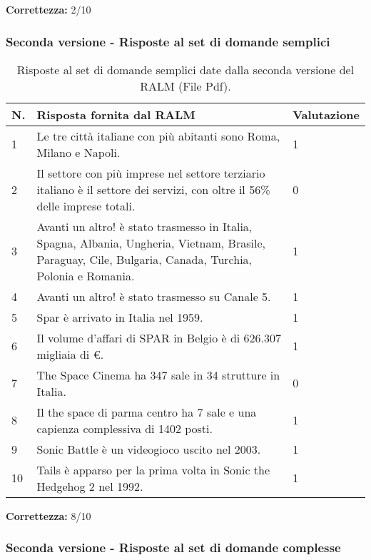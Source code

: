 \textbf{Correttezza:} 2/10

\subsubsection{Seconda versione - Risposte al set di domande semplici}

\begin{table}[H]
    \centering
    \begin{tabular}{|p{0.5cm} |p{6cm} |p{2cm}|}
        \hline
        \textbf{N}. & \textbf{Risposta fornita dal RALM} & \textbf{Valutazione} \\
        \hline
        1 & Le tre città italiane con più abitanti sono Roma, Milano e Napoli. & 1 \\
        \hline
        2 & Il settore con più imprese nel settore terziario italiano è il settore dei servizi, con oltre il 56\% delle imprese totali. & 0 \\
        \hline
        3 & Avanti un altro! è stato trasmesso in Italia, Spagna, Albania, Ungheria, Vietnam, Brasile, Paraguay, Cile, Bulgaria, Canada, Turchia, Polonia e Romania. & 1 \\
        \hline
        4 & Avanti un altro! è stato trasmesso su Canale 5. & 1 \\
        \hline
        5 & Spar è arrivato in Italia nel 1959. & 1 \\
        \hline
        6 & Il volume d'affari di SPAR in Belgio è di 626.307 migliaia di €. & 1 \\
        \hline
        7 & The Space Cinema ha 347 sale in 34 strutture in Italia. & 0 \\
        \hline
        8 & Il the space di parma centro ha 7 sale e una capienza complessiva di 1402 posti. & 1 \\
        \hline
        9 & Sonic Battle è un videogioco uscito nel 2003. & 1 \\
        \hline
        10 & Tails è apparso per la prima volta in Sonic the Hedgehog 2 nel 1992. & 1 \\
        \hline
    \end{tabular}
    \caption{Risposte al set di domande semplici date dalla seconda versione del RALM (File Pdf).}
\end{table}

\textbf{Correttezza:} 8/10

\subsubsection{Seconda versione - Risposte al set di domande complesse}

